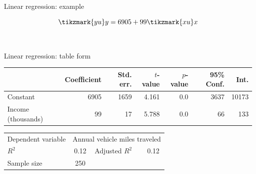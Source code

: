 \begin{frame}{Linear regression: example}
  \Huge

  \begin{equation*}
    \tikzmark{yu}y = 6905 + 99\tikzmark{xu}x
  \end{equation*}

  \\
  \tiny\citenhts
\end{frame}

\begin{frame}{Linear regression: table form}
  \small
  \begin{tabular}{lrrrrrr}
  \toprule
  {} &  Coefficient &  Std. err. &  $t$-value &  $p$-value &  95\% Conf. &   Int. \\
  \midrule
  Constant           &         6905 &       1659 &      4.161 &        0.0 &       3637 &  10173 \\
  Income (thousands) &           99 &         17 &      5.788 &        0.0 &         66 &    133 \\
  \bottomrule
  \end{tabular}
  \begin{tabular}{lclc}
  Dependent variable & \multicolumn{3}{l}{Annual vehicle miles traveled} \\
  $R^2$ & 0.12 & Adjusted $R^2$ & 0.12 \\
  Sample size & 250 && \\
  \end{tabular}\\
  \tiny\citenhts
\end{frame}


